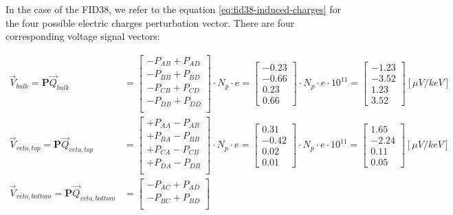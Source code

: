 In the case of the FID38, we refer to the equation \ref{eq:fid38-induced-charges} for the four possible electric charges perturbation vector. There are four corresponding voltage signal vectors:

\begin{align}
\label{eq:fid38-sensitivity}
\vec{V}_{bulk} = \bm{P} \vec{Q}_{bulk} &=
\begin{bmatrix}
- P_{AB} + P_{AD} \\
- P_{BB} + P_{BD} \\
- P_{CB} + P_{CD} \\
- P_{DB} + P_{DD} \\
\end{bmatrix}
\cdot N_p \cdot e
= 
\begin{bmatrix}
-0.23 \\ -0.66 \\ 0.23 \\ 0.66
\end{bmatrix}
\cdot N_p \cdot e \cdot 10^{11}
=
\begin{bmatrix}
-1.23 \\ -3.52 \\ 1.23 \\ 3.52
\end{bmatrix}
[\mu V/ keV]
\\
\vec{V}_{veto, top} = \bm{P} \vec{Q}_{veto,top} &=
\begin{bmatrix}
+ P_{AA} - P_{AB} \\
+ P_{BA} - P_{BB} \\
+ P_{CA} - P_{CB} \\
+ P_{DA} - P_{DB} \\
\end{bmatrix}
\cdot N_p \cdot e
= 
\begin{bmatrix}
0.31 \\ -0.42 \\ 0.02 \\ 0.01
\end{bmatrix}
\cdot N_p \cdot e \cdot 10^{11}
= 
\begin{bmatrix}
1.65 \\ -2.24 \\ 0.11 \\ 0.05
\end{bmatrix}
[\mu V/keV]
\\
\vec{V}_{veto,bottom} = \bm{P} \vec{Q}_{veto,bottom} &=
\begin{bmatrix}
- P_{AC} + P_{AD} \\
- P_{BC} + P_{BD} \\

\end{bmatrix}
\end{align}
